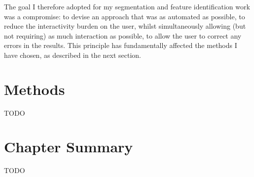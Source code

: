 The goal I therefore adopted for my segmentation and feature identification work was a compromise: to devise an approach that was as automated as possible, to reduce the interactivity burden on the user, whilst simultaneously allowing (but not requiring) as much interaction as possible, to allow the user to correct any errors in the results. This principle has fundamentally affected the methods I have chosen, as described in the next section.

\section{Methods}

TODO

\section{Chapter Summary}

TODO

